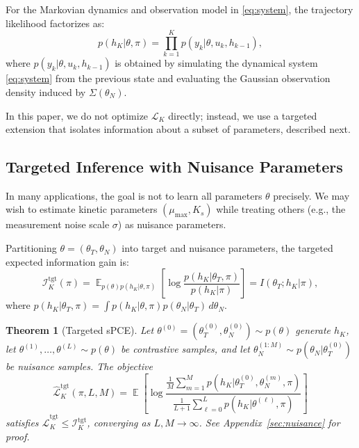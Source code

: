 \documentclass[conference]{IEEEtran}
\newtheorem{theorem}{Theorem}
\DeclareMathOperator{\E}{\mathbb{E}}
\begin{document}
For the Markovian dynamics and observation model in \eqref{eq:system}, the trajectory likelihood factorizes as:
\begin{equation}
p(h_K|\theta,\pi) = \prod_{k=1}^{K} p(y_k|\theta, u_k, h_{k-1}),
\end{equation}
where $p(y_k|\theta, u_k, h_{k-1})$ is obtained by simulating the dynamical system \eqref{eq:system} from the previous state and evaluating the Gaussian observation density induced by $\Sigma(\theta_N)$.

In this paper, we do not optimize $\mathcal{L}_K$ directly; instead, we use a targeted extension that isolates information about a subset of parameters, described next.

\subsection{Targeted Inference with Nuisance Parameters}
In many applications, the goal is not to learn all parameters $\theta$ precisely. We may wish to estimate kinetic parameters $(\mu_{\max}, K_s)$ while treating others (e.g., the measurement noise scale $\sigma$) as nuisance parameters.

Partitioning $\theta = (\theta_T, \theta_N)$ into target and nuisance parameters, the targeted expected information gain is:
\begin{equation}
\mathcal{I}_K^{\text{tgt}}(\pi) = \E_{p(\theta)p(h_K|\theta,\pi)}\left[\log \frac{p(h_K|\theta_T,\pi)}{p(h_K|\pi)}\right] = I(\theta_T; h_K | \pi),
\end{equation}
where $p(h_K|\theta_T, \pi) = \int p(h_K|\theta, \pi) p(\theta_N|\theta_T) \, d\theta_N$.

\begin{theorem}[Targeted sPCE]
\label{thm:targeted_spce_main}
Let $\theta^{(0)} = (\theta_T^{(0)}, \theta_N^{(0)}) \sim p(\theta)$ generate $h_K$, let $\theta^{(1)},\ldots,\theta^{(L)} \sim p(\theta)$ be contrastive samples, and let $\theta_N^{(1:M)} \sim p(\theta_N|\theta_T^{(0)})$ be nuisance samples. The objective
\begin{equation}
\hat{\mathcal{L}}_K^{\text{tgt}}(\pi, L, M) = \E\left[\log \frac{\frac{1}{M}\sum_{m=1}^{M} p(h_K|\theta_T^{(0)}, \theta_N^{(m)}, \pi)}{\frac{1}{L+1}\sum_{\ell=0}^{L} p(h_K|\theta^{(\ell)}, \pi)}\right]
\end{equation}
satisfies $\hat{\mathcal{L}}_K^{\text{tgt}} \leq \mathcal{I}_K^{\text{tgt}}$, converging as $L, M \to \infty$. See Appendix~\ref{sec:nuisance} for proof.
\end{theorem}
\end{document}
